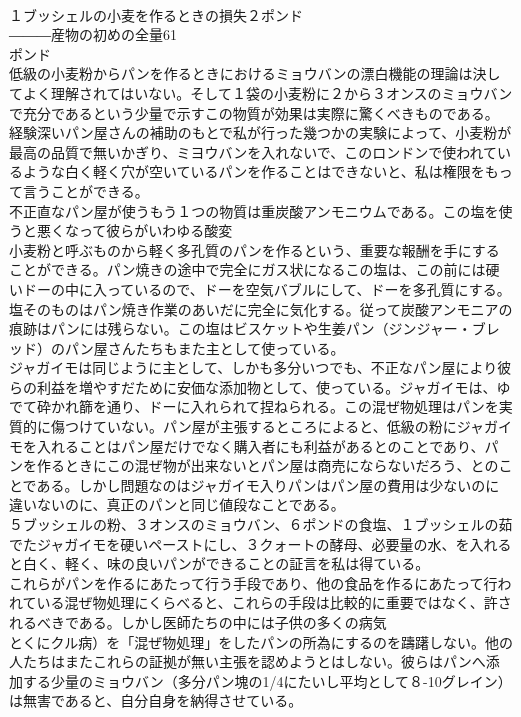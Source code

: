 \documentclass[8pt]{extreport}
\begin{document}
\begin{CJK}{UTF8}{min}
\\	１ブッシェルの小麦を作るときの損失２ポンド
\\	―――産物の初めの全量61
\\	ポンド
\\	低級の小麦粉からパンを作るときにおけるミョウバンの漂白機能の理論は決してよく理解されてはいない。そして１袋の小麦粉に２から３オンスのミョウバンで充分であるという少量で示すこの物質が効果は実際に驚くべきものである。
\\	経験深いパン屋さんの補助のもとで私が行った幾つかの実験によって、小麦粉が最高の品質で無いかぎり、ミヨウバンを入れないで、このロンドンで使われているような白く軽く穴が空いているパンを作ることはできないと、私は権限をもって言うことができる。
\\	不正直なパン屋が使うもう１つの物質は重炭酸アンモニウムである。この塩を使うと悪くなって彼らがいわゆる酸変
\\	小麦粉と呼ぶものから軽く多孔質のパンを作るという、重要な報酬を手にすることができる。パン焼きの途中で完全にガス状になるこの塩は、この前には硬いドーの中に入っているので、ドーを空気バブルにして、ドーを多孔質にする。塩そのものはパン焼き作業のあいだに完全に気化する。従って炭酸アンモニアの痕跡はパンには残らない。この塩はビスケットや生姜パン（ジンジャー・ブレッド）のパン屋さんたちもまた主として使っている。
\\	ジャガイモは同じように主として、しかも多分いつでも、不正なパン屋により彼らの利益を増やすだために安価な添加物として、使っている。ジャガイモは、ゆでて砕かれ篩を通り、ドーに入れられて捏ねられる。この混ぜ物処理はパンを実質的に傷つけていない。パン屋が主張するところによると、低級の粉にジャガイモを入れることはパン屋だけでなく購入者にも利益があるとのことであり、パンを作るときにこの混ぜ物が出来ないとパン屋は商売にならないだろう、とのことである。しかし問題なのはジャガイモ入りパンはパン屋の費用は少ないのに違いないのに、真正のパンと同じ値段なことである。
\\	５ブッシェルの粉、３オンスのミョウバン、６ポンドの食塩、１ブッシェルの茹でたジャガイモを硬いペーストにし、３クォートの酵母、必要量の水、を入れると白く、軽く、味の良いパンができることの証言を私は得ている。
\\	これらがパンを作るにあたって行う手段であり、他の食品を作るにあたって行われている混ぜ物処理にくらべると、これらの手段は比較的に重要ではなく、許されるべきである。しかし医師たちの中には子供の多くの病気
\\	とくにクル病）を「混ぜ物処理」をしたパンの所為にするのを躊躇しない。他の人たちはまたこれらの証拠が無い主張を認めようとはしない。彼らはパンへ添加する少量のミョウバン（多分パン塊の1/4にたいし平均として８-10グレイン）は無害であると、自分自身を納得させている。

\end{CJK}
\end{document}
